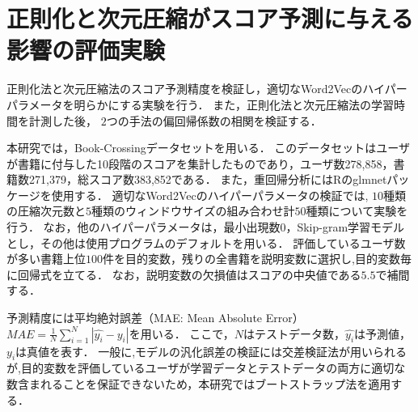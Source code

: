 \section{正則化と次元圧縮がスコア予測に与える影響の評価実験}
正則化法と次元圧縮法のスコア予測精度を検証し，適切なWord2Vecのハイパーパラメータを明らかにする実験を行う．
また，正則化法と次元圧縮法の学習時間を計測した後， $2$つの手法の偏回帰係数の相関を検証する．

本研究では，Book-Crossingデータセットを用いる．
このデータセットはユーザが書籍に付与した10段階のスコアを集計したものであり，ユーザ数278,858，書籍数271,379，総スコア数383,852である．
また，重回帰分析にはRのglmnetパッケージを使用する．
適切なWord2Vecのハイパーパラメータの検証では, $10$種類の圧縮次元数と$5$種類のウィンドウサイズの組み合わせ計$50$種類について実験を行う．
なお，他のハイパーパラメータは，最小出現数0，Skip-gram学習モデルとし，その他は使用プログラム\cite{w2v}のデフォルトを用いる．
評価しているユーザ数が多い書籍上位$100$件を目的変数，残りの全書籍を説明変数に選択し,目的変数毎に回帰式を立てる．
なお，説明変数の欠損値はスコアの中央値である$5.5$で補間する．

予測精度には平均絶対誤差（MAE: Mean Absolute Error）$MAE = \frac{1}{N} \sum_{i=1}^N |\hat{y_i} - y_i| \label{mae} $を用いる．
ここで，$N$はテストデータ数，$\hat{y_i}$は予測値，$y_i$は真値を表す．
一般に,モデルの汎化誤差の検証には交差検証法が用いられるが,目的変数を評価しているユーザが学習データとテストデータの両方に適切な数含まれることを保証できないため，本研究ではブートストラップ法を適用する．